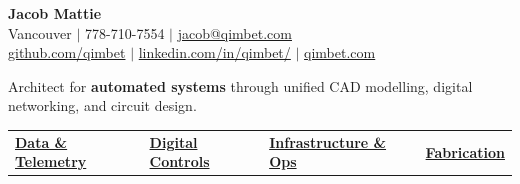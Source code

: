 \documentclass[a4paper,10pt]{article}
\begin{document}
	\begin{center}
		\vspace{-2.05mm}
		{\huge \bfseries Jacob Mattie} \\[0.75em]
		Vancouver $|$ 778-710-7554 $|$ 
		\href{mailto:jacob@qimbet.com}{jacob@qimbet.com} \\
		[0.15em]
		
		\href{https://github.com/qimbet}{github.com/qimbet} $|$ 
		\href{https://www.linkedin.com/in/qimbet/}{linkedin.com/in/qimbet/}  $|$
		\href{www.qimbet.com}{qimbet.com}
		
		
		\vspace{0.5mm}
		


		\vspace{1.8mm}

		Architect for  \textbf{automated systems} through unified CAD modelling, digital networking,  and circuit design.
		
		
		\vspace{1em}
		
		\noindent
		

\begin{tabularx}{\linewidth}{@{}X|X|X|X@{}}
	\textbf{\underline{Data \& Telemetry}} &
	\textbf{\underline{Digital Controls}} &
	\textbf{\underline{Infrastructure \& Ops}} &
	\textbf{\underline{Fabrication}} \\
	

\end{tabularx}
\end{center}
\end{document}
